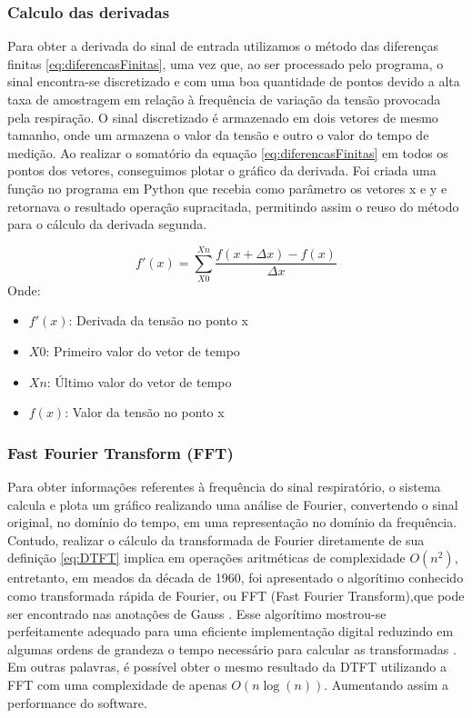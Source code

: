 \subsubsection{Calculo das derivadas}

Para obter a derivada do sinal de entrada utilizamos o método das diferenças finitas \ref{eq:diferencasFinitas}, uma vez que, ao ser processado pelo programa, o sinal encontra-se discretizado e com uma boa quantidade de pontos devido a alta taxa de amostragem em relação à frequência de variação da tensão provocada pela respiração. O sinal discretizado é armazenado em dois vetores de mesmo tamanho, onde um armazena o valor da tensão e outro o valor do tempo de medição. Ao realizar o somatório da equação \ref{eq:diferencasFinitas} em todos os pontos dos vetores, conseguimos plotar o gráfico da derivada. Foi criada uma função no programa em Python que recebia como parâmetro os vetores x e y e retornava o resultado operação supracitada, permitindo assim o reuso do método para o cálculo da derivada segunda.


\begin{equation} \label{eq:diferencasFinitas}
	f'(x) =  \sum_{X0}^{Xn} \dfrac{f(x+\Delta x) - f(x)}{\Delta x}
\end{equation}
Onde:
\begin{itemize}[label=]
	\item $f'(x)$: Derivada da tensão no ponto x
	\item $X0$: Primeiro valor do vetor de tempo
	\item $Xn$: Último valor do vetor de tempo
	\item $f(x)$: Valor da tensão no ponto x
\end{itemize}

\subsubsection{Fast Fourier Transform (FFT)}

Para obter informações referentes à frequência do sinal respiratório, o sistema calcula e plota um gráfico realizando uma análise de Fourier, convertendo o sinal original, no domínio do tempo, em uma representação no domínio da frequência. Contudo,  realizar o cálculo da transformada de Fourier diretamente de sua definição \ref{eq:DTFT} implica em operações aritméticas de complexidade  \boldmath $O(n^2)$, entretanto, em meados da década de 1960, foi apresentado o algorítimo conhecido como transformada rápida de Fourier, ou FFT (Fast Fourier Transform),que pode ser encontrado nas anotações de Gauss \cite{heideman1985gauss}. Esse algorítimo mostrou-se perfeitamente adequado para uma eficiente implementação digital reduzindo em algumas ordens de grandeza o tempo necessário para calcular as transformadas \cite{oppenheim2010}. Em outras palavras, é possível obter o mesmo resultado da DTFT utilizando a FFT com uma complexidade de apenas $O(n \log (n)) $.   \unboldmath Aumentando assim a performance do software.



